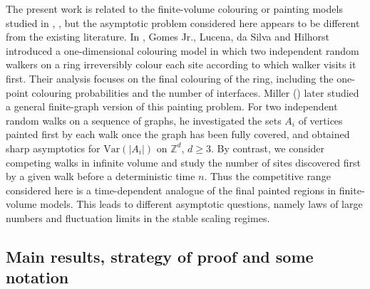 \documentclass[12pt]{article}
\newcommand{\1}{\mathds{1}}
\newcommand{\ZZ}{\mathbb Z}
\newcommand{\Var}{\mathrm{Var}}
\numberwithin{equation}{section}
\begin{document}
The present work is related to the finite-volume colouring or painting models studied in \cite{JuniorLucenaSilvaHilhorst1996}, \cite{Miller2010PaintingAG},
but the asymptotic problem considered here appears to be different from the existing literature. In \cite{JuniorLucenaSilvaHilhorst1996}, Gomes Jr., Lucena, da Silva and Hilhorst introduced a one-dimensional colouring
model in which two independent random walkers on a ring irreversibly colour each site according to which walker visits it first. Their analysis focuses on the final colouring of the ring,
including the one-point colouring probabilities and the number of interfaces.
Miller (\cite{Miller2010PaintingAG}) later studied a general finite-graph version of this painting problem. For two independent random walks on a sequence of graphs, he investigated the sets $A_i$ of vertices painted
first by each walk once the graph has been fully covered, and obtained sharp asymptotics for
$\Var(|A_i|)$ on $\ZZ^d$, $d\ge3$. By contrast, we consider competing walks in infinite volume and study the number of sites
discovered first by a given walk before a deterministic time $n$. Thus the competitive range
considered here is a time-dependent analogue of the final painted regions in finite-volume
models. This leads to different asymptotic questions, namely laws of large numbers and fluctuation limits in the stable scaling regimes.

\subsection{Main results, strategy of proof and some notation}
\label{susbection:main results, strategy of proof}
\end{document}
